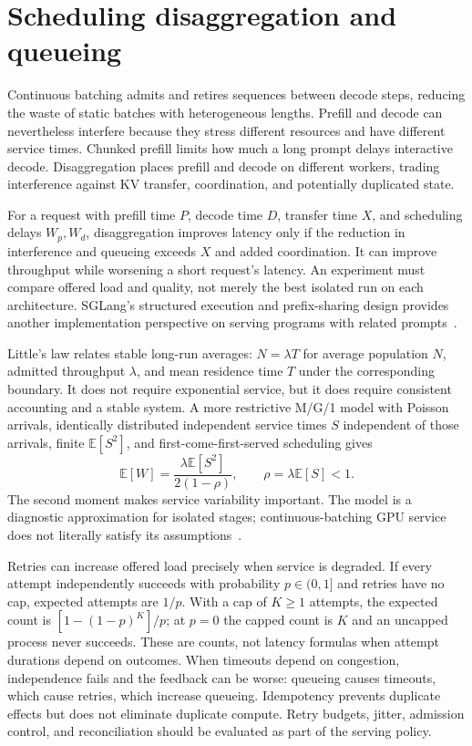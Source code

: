 \section{Scheduling disaggregation and queueing}\label{sec:C31:07}
Continuous batching admits and retires sequences between decode steps, reducing the waste of static batches with heterogeneous lengths. Prefill and decode can nevertheless interfere because they stress different resources and have different service times. Chunked prefill limits how much a long prompt delays interactive decode. Disaggregation places prefill and decode on different workers, trading interference against KV transfer, coordination, and potentially duplicated state.

For a request with prefill time $P$, decode time $D$, transfer time $X$, and scheduling delays $W_p,W_d$, disaggregation improves latency only if the reduction in interference and queueing exceeds $X$ and added coordination. It can improve throughput while worsening a short request's latency. An experiment must compare offered load and quality, not merely the best isolated run on each architecture. SGLang's structured execution and prefix-sharing design provides another implementation perspective on serving programs with related prompts~\cite{zheng2023sglang}.

Little's law relates stable long-run averages: $N=\lambda T$ for average population $N$, admitted throughput $\lambda$, and mean residence time $T$ under the corresponding boundary. It does not require exponential service, but it does require consistent accounting and a stable system. A more restrictive M/G/1 model with Poisson arrivals, identically distributed independent service times $S$ independent of those arrivals, finite $\mathbb E[S^2]$, and first-come-first-served scheduling gives
\begin{equation}
 \mathbb E[W]=\frac{\lambda\mathbb E[S^2]}{2(1-\rho)},
 \qquad \rho=\lambda\mathbb E[S]<1.
\end{equation}
The second moment makes service variability important. The model is a diagnostic approximation for isolated stages; continuous-batching GPU service does not literally satisfy its assumptions~\cite{root_harchol2013}.

Retries can increase offered load precisely when service is degraded. If every attempt independently succeeds with probability $p\in(0,1]$ and retries have no cap, expected attempts are $1/p$. With a cap of $K\geq1$ attempts, the expected count is $[1-(1-p)^K]/p$; at $p=0$ the capped count is $K$ and an uncapped process never succeeds. These are counts, not latency formulas when attempt durations depend on outcomes. When timeouts depend on congestion, independence fails and the feedback can be worse: queueing causes timeouts, which cause retries, which increase queueing. Idempotency prevents duplicate effects but does not eliminate duplicate compute. Retry budgets, jitter, admission control, and reconciliation should be evaluated as part of the serving policy.

